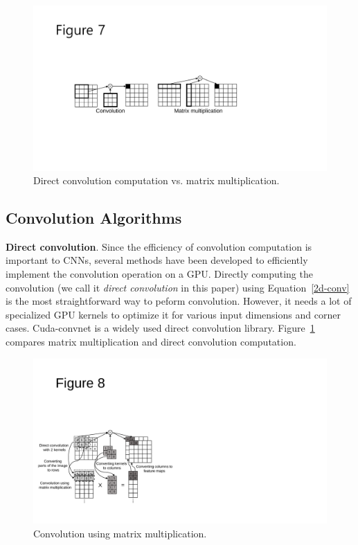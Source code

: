 \begin{figure}[htbp]
  \centering
  \includegraphics[width=\linewidth]{./figures/direct}
  \caption{Direct convolution computation vs. matrix multiplication.}
  \label{fig_direct}
\end{figure}

\subsection{Convolution Algorithms}
\label{sec:algorithms}
{\bf Direct convolution}. Since the efficiency of convolution computation is important to CNNs, several methods have been developed to efficiently implement the convolution operation on a GPU. Directly computing the convolution (we call it \textit{direct convolution} in this paper) using Equation~\ref{2d-conv} is the most straightforward way to peform convolution. However, it needs a lot of specialized GPU kernels to optimize it for various input dimensions and corner cases. Cuda-convnet\cite{cuda-convnet} is a widely used direct convolution library. Figure~\ref{fig_direct} compares matrix multiplication and direct convolution computation.

\begin{figure}[htbp]
  \centering
  \includegraphics[width=\linewidth]{./figures/matmul}
  \caption{Convolution using matrix multiplication.}
  \label{fig_matmul}
\end{figure}

